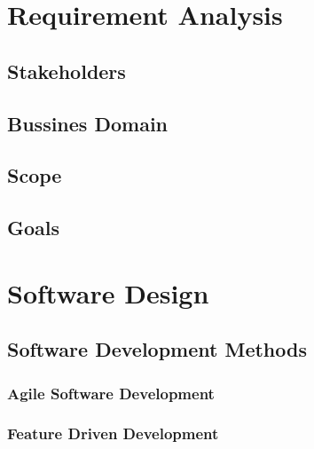 \documentclass{article}
\begin{document}
        \pagebreak

\section{Requirement Analysis}


        \subsection{Stakeholders}
        

        \subsection{Bussines Domain}
        

        \subsection{Scope}
        
    
        \subsection{Goals}
        

        \pagebreak

\section{Software Design}

    \subsection{Software Development Methods}
    

        \subsubsection{Agile Software Development}
        

        \subsubsection{Feature Driven Development}
        
\end{document}
